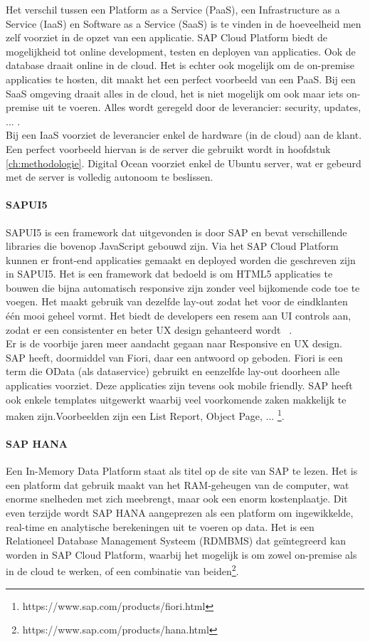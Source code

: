     Het verschil tussen een Platform as a Service (PaaS), een Infrastructure as a Service (IaaS) en Software as a Service (SaaS) is te vinden in de hoeveelheid men zelf voorziet in de opzet van een applicatie. SAP Cloud Platform biedt de mogelijkheid tot online development, testen en deployen van applicaties. Ook de database draait online in de cloud. Het is echter ook mogelijk om de on-premise applicaties te hosten, dit maakt het een perfect voorbeeld van een PaaS. Bij een SaaS omgeving draait alles in de cloud, het is niet mogelijk om ook maar iets on-premise uit te voeren. Alles wordt geregeld door de leverancier: security, updates, ... .\\
    Bij een IaaS voorziet de leverancier enkel de hardware (in de cloud) aan de klant. Een perfect voorbeeld hiervan is de server die gebruikt wordt in hoofdstuk \ref{ch:methodologie}. Digital Ocean voorziet enkel de Ubuntu server, wat er gebeurd met de server is volledig autonoom te beslissen.
    
    \paragraph{SAPUI5}
    SAPUI5 is een framework dat uitgevonden is door SAP en bevat verschillende libraries die bovenop JavaScript gebouwd zijn. Via het SAP Cloud Platform kunnen er front-end applicaties gemaakt en deployed worden die geschreven zijn in SAPUI5. Het is een framework dat bedoeld is om HTML5 applicaties te bouwen die bijna automatisch responsive zijn zonder veel bijkomende code toe te voegen.
    Het maakt gebruik van dezelfde lay-out zodat het voor de eindklanten één mooi geheel vormt. Het biedt de developers een resem aan UI controls aan, zodat er een consistenter en beter UX design gehanteerd wordt ~\autocite{SAPSEa}. \\
    Er is de voorbije jaren meer aandacht gegaan naar Responsive en UX design. SAP heeft, doormiddel van Fiori, daar een antwoord op geboden. Fiori is een term die OData (als dataservice) gebruikt en eenzelfde lay-out doorheen alle applicaties voorziet. Deze applicaties zijn tevens ook mobile friendly. SAP heeft ook enkele templates uitgewerkt waarbij veel voorkomende zaken makkelijk te maken zijn.Voorbeelden zijn een List Report, Object Page, ... \footnote{https://www.sap.com/products/fiori.html}.
    
    \paragraph{SAP HANA}
    Een In-Memory Data Platform staat als titel op de site van SAP te lezen. Het is een platform dat gebruik maakt van het RAM-geheugen van de computer, wat enorme snelheden met zich meebrengt, maar ook een enorm kostenplaatje. Dit even terzijde wordt SAP HANA aangeprezen als een platform om ingewikkelde, real-time en analytische berekeningen uit te voeren op data.
    Het is een Relationeel Database Management Systeem (RDMBMS) dat geïntegreerd kan worden in SAP Cloud Platform, waarbij het mogelijk is om zowel on-premise als in de cloud te werken, of een combinatie van beiden\footnote{https://www.sap.com/products/hana.html}.
